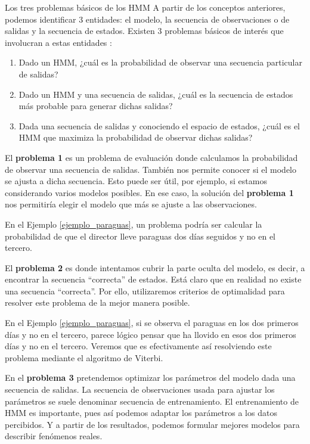 \begin{section}{Los tres problemas básicos de los HMM}
A partir de los conceptos anteriores, podemos identificar 3 entidades: el modelo, la secuencia de observaciones o de salidas y la secuencia de estados. Existen 3 problemas básicos de interés que involucran a estas entidades \cite{Vidyasagar}:
\begin{enumerate}
    \item Dado un HMM, ¿cuál es la probabilidad de observar una secuencia particular de salidas?
    \item Dado un HMM y una secuencia de salidas, ¿cuál es la secuencia de estados más probable para generar dichas salidas?
    \item Dada una secuencia de salidas y conociendo el espacio de estados, ¿cuál es el HMM que maximiza la probabilidad de observar dichas salidas?
\end{enumerate}

El \textbf{problema 1} es un problema de evaluación donde calculamos la probabilidad de observar una secuencia de salidas. También nos permite conocer si el modelo se ajusta a dicha secuencia. Esto puede ser útil, por ejemplo, si estamos considerando varios modelos posibles. En ese caso, la solución del \textbf{problema 1} nos permitiría elegir el modelo que más se ajuste a las observaciones.

En el Ejemplo \ref{ejemplo_paraguas}, un problema podría ser calcular la probabilidad de que el director lleve paraguas dos días seguidos y no en el tercero.

El \textbf{problema 2} es donde intentamos cubrir la parte oculta del modelo, es decir, a encontrar la secuencia \enquote{correcta} de estados. Está claro que en realidad no existe una secuencia \enquote{correcta}. Por ello, utilizaremos criterios de optimalidad para resolver este problema de la mejor manera posible. 

En el Ejemplo \ref{ejemplo_paraguas}, si se observa el paraguas en los dos primeros días y no en el tercero, parece lógico pensar que ha llovido en esos dos primeros días y no en el tercero. Veremos que es efectivamente así resolviendo este problema mediante el algoritmo de Viterbi.

En el \textbf{problema 3} pretendemos optimizar los parámetros del modelo dada una secuencia de salidas. La secuencia de observaciones usada para ajustar los parámetros se suele denominar secuencia de entrenamiento. El entrenamiento de HMM es importante, pues así podemos adaptar los parámetros a los datos percibidos. Y a partir de los resultados, podemos formular mejores modelos para describir fenómenos reales.


\end{section}
